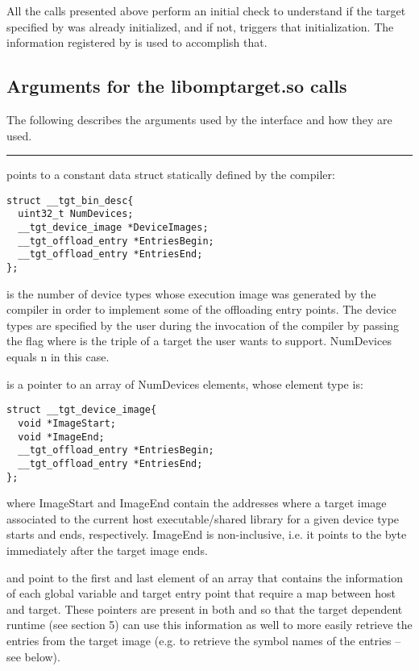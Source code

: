 All the  calls presented above perform an initial check to understand if the target specified by  was already initialized, and if not, triggers that initialization. The information registered by  is used to accomplish that.

\subsection{Arguments for the libomptarget.so calls}
The following describes the arguments used by the \libomptarget{} interface and how they are used.

\noindent\rule{\textwidth}{0.4pt}

 points to a constant data struct statically defined by the compiler:
\begin{lstlisting}
struct __tgt_bin_desc{
  uint32_t NumDevices; 
  __tgt_device_image *DeviceImages; 
  __tgt_offload_entry *EntriesBegin;
  __tgt_offload_entry *EntriesEnd; 
};
\end{lstlisting}

 is the number of device types whose execution image was generated by the compiler in order to implement some of the offloading entry points. The device types are specified by the user during the invocation of the compiler by passing the flag  where  is the triple of a target the user wants to support. NumDevices equals n in this case. 

 is a pointer to an array of NumDevices elements, whose element type is:
\begin{lstlisting}
struct __tgt_device_image{
  void *ImageStart;
  void *ImageEnd;
  __tgt_offload_entry *EntriesBegin;
  __tgt_offload_entry *EntriesEnd; 
};
\end{lstlisting}
%
where ImageStart and ImageEnd contain the addresses where a target image associated to the current host executable/shared library for a given device type starts and ends, respectively. ImageEnd is non-inclusive, i.e. it points to the byte immediately after the target image ends.

 and  point to the first and last element of an array that contains the information of each global variable and target entry point that require a map between host and target. These pointers are present in both  and  so that the target dependent runtime (see section 5) can use this information as well to more easily retrieve the entries from the target image (e.g. to retrieve the symbol names of the entries – see below). 

